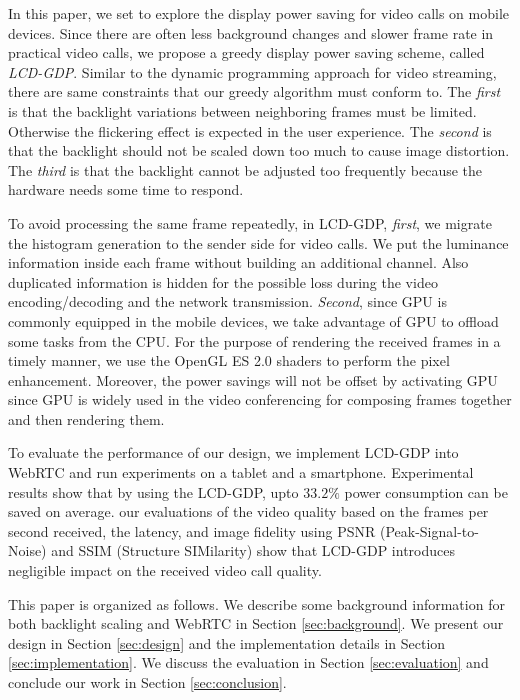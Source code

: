 In this paper, we set to explore the display power saving for video
calls on mobile devices. Since there are often less background changes
and slower frame rate in practical video calls, we propose a greedy
display power saving scheme, called {\it LCD-GDP}.  Similar to the
dynamic programming approach for video streaming, there are same
constraints that our greedy algorithm must conform to. The {\it first}
is that the backlight variations between neighboring frames must be
limited. Otherwise the flickering effect is expected in the user
experience. The {\it second} is that the backlight should not be
scaled down too much to cause image distortion.  The {\it third} is
that the backlight cannot be adjusted too frequently because the
hardware needs some time to respond.

To avoid processing the same frame repeatedly, in LCD-GDP, {\it
  first}, we migrate the histogram generation to the sender side for
video calls. We put the luminance information inside each frame
without building an additional channel. Also duplicated information is
hidden for the possible loss during the video encoding/decoding and
the network transmission. {\it Second}, since GPU is commonly equipped
in the mobile devices, we take advantage of GPU to offload some tasks
from the CPU. For the purpose of rendering the received frames in a
timely manner, we use the OpenGL ES 2.0 shaders to perform the pixel
enhancement.  Moreover, the power savings will not be offset by
activating GPU since GPU is widely used in the video conferencing for
composing frames together and then rendering them.

To evaluate the performance of our design, we implement LCD-GDP into
WebRTC and run experiments on a tablet and a smartphone. Experimental
results show that by using the LCD-GDP, upto $33.2\%$ power
consumption can be saved on average. our evaluations of the video
quality based on the frames per second received, the latency, and
image fidelity using PSNR (Peak-Signal-to-Noise) and SSIM (Structure
SIMilarity) show that LCD-GDP introduces negligible impact on the
received video call quality.


This paper is organized as follows. We describe some background
information for both backlight scaling and WebRTC in Section
\ref{sec:background}. We present our design in Section
\ref{sec:design} and the implementation details in Section
\ref{sec:implementation}. We discuss the evaluation in Section
\ref{sec:evaluation} and conclude our work in Section
\ref{sec:conclusion}.

